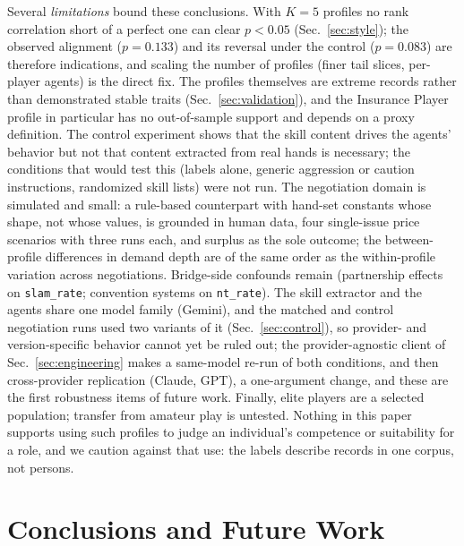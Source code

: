 \documentclass[11pt,a4paper]{article}
\begin{document}
Several \emph{limitations} bound these conclusions. With $K=5$
profiles no rank correlation short of a perfect one can clear $p<0.05$
(Sec.~\ref{sec:style}); the observed alignment ($p=0.133$) and its
reversal under the control ($p=0.083$) are therefore indications, and
scaling the number of profiles (finer tail slices, per-player agents)
is the direct fix. The profiles themselves are extreme records rather
than demonstrated stable traits (Sec.~\ref{sec:validation}), and the
Insurance Player profile in particular has no out-of-sample support
and depends on a proxy definition. The control experiment shows that
the skill content drives the agents' behavior but not that content
extracted from real hands is necessary; the conditions that would test
this (labels alone, generic aggression or caution instructions,
randomized skill lists) were not run. The negotiation domain is
simulated and small: a rule-based counterpart with hand-set constants
whose shape, not whose values, is grounded in human data, four
single-issue price scenarios with three runs each, and surplus as the
sole outcome; the between-profile differences in demand depth are of
the same order as the within-profile variation across negotiations.
Bridge-side confounds remain (partnership effects on
\texttt{slam\_rate}; convention systems on \texttt{nt\_rate}). The skill
extractor and the agents share one model family (Gemini), and the
matched and control negotiation runs used two variants of it
(Sec.~\ref{sec:control}), so provider- and version-specific behavior
cannot yet be ruled out; the provider-agnostic client of
Sec.~\ref{sec:engineering} makes a same-model re-run of both
conditions, and then cross-provider replication (Claude, GPT), a
one-argument change, and these are the first robustness items of
future work. Finally,
elite players are a selected population; transfer from amateur play is
untested. Nothing in this paper supports using such profiles to judge
an individual's competence or suitability for a role, and we caution
against that use: the labels describe records in one corpus, not
persons.

\section{Conclusions and Future Work}\label{sec:conclusion}
\end{document}
